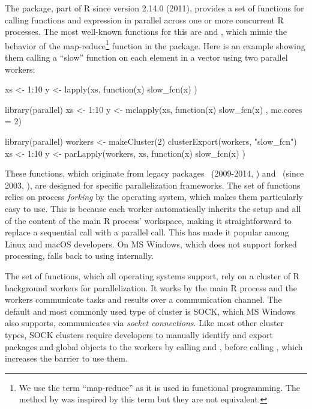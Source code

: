 The  package, part of R since version 2.14.0 (2011),
provides a set of functions for calling functions and expression in
parallel across one or more concurrent R processes. The most
well-known functions for this are 
and , which mimic the behavior of the
map-reduce\footnote{We use the term ``map-reduce'' as it is used in
functional programming. The  method by
\citet{DeanGhemawat2004} was inspired by this term but they are not
equivalent.}
function  in the  package.  Here is an
example showing them calling a ``slow'' function on each element in a
vector using two parallel workers:
%
\begin{example}
xs <- 1:10
y <- lapply(xs, function(x) {
  slow_fcn(x)
})

library(parallel)
xs <- 1:10
y <- mclapply(xs, function(x) {
  slow_fcn(x)
}, mc.cores = 2)

library(parallel)
workers <- makeCluster(2)
clusterExport(workers, "slow_fcn")
xs <- 1:10
y <- parLapply(workers, xs, function(x) {
  slow_fcn(x)
})
\end{example}
%
These functions, which originate from legacy packages
~(2009-2014, \citet{CRAN:multicore}) and
~(since 2003, \citet{CRAN:snow}), are designed for
specific parallelization frameworks. The  set of
functions relies on process \emph{forking} by the operating system,
which makes them particularly easy to use.  This is because each
worker automatically inherits the setup and all of the content of the
main R process' workspace, making it straightforward to replace a
sequential
 call with a parallel  call. This
has made it popular among Linux and macOS developers. On MS Windows,
which does not support forked processing,  falls back
to using  internally.

The  set of functions, which all operating systems
support, rely on a cluster of R background workers for
parallelization. It works by the main R process and the workers
communicate tasks and results over a communication channel. The
default and most commonly used type of cluster is SOCK, which MS
Windows also supports, communicates via \emph{socket connections}. Like
most other cluster types, SOCK clusters require developers to manually
identify and export packages and global objects to the workers by
calling  and
, before calling , which
increases the barrier to use them.

